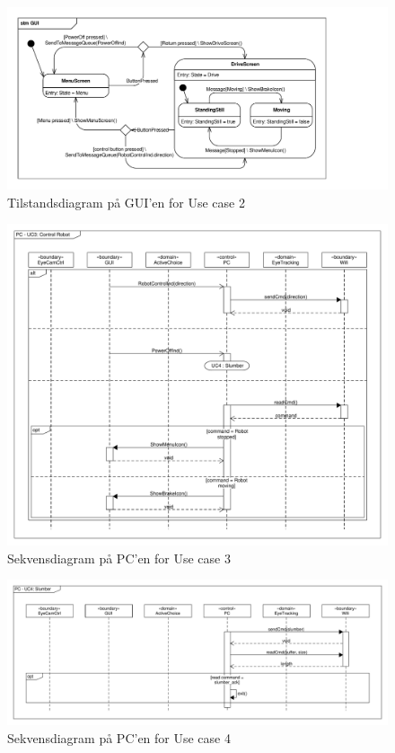 \begin{figure} [H]
	\centering
	\includegraphics[clip, trim = 0cm 0cm 0cm 0.5cm ,width = \textwidth]{Figur/STM_GUI.pdf}
	\caption{Tilstandsdiagram på GUI'en for Use case 2}
	\label{fig:STM_PC_UC2}
\end{figure}

\begin{figure} [H]
	\centering
	\includegraphics[clip, trim = 0cm 0cm 0cm 0.5cm ,width = \textwidth]{Figur/seq_PC_UC3.pdf}
	\caption{Sekvensdiagram på PC'en for Use case 3}
	\label{fig:seq_PC_UC3}
\end{figure}

\begin{figure} [H]
	\centering
	\includegraphics[clip, trim = 0cm 0cm 0cm 0.5cm ,width = \textwidth]{Figur/seq_PC_UC4.pdf}
	\caption{Sekvensdiagram på PC'en for Use case 4}
	\label{fig:seq_PC_UC4}
\end{figure}	

